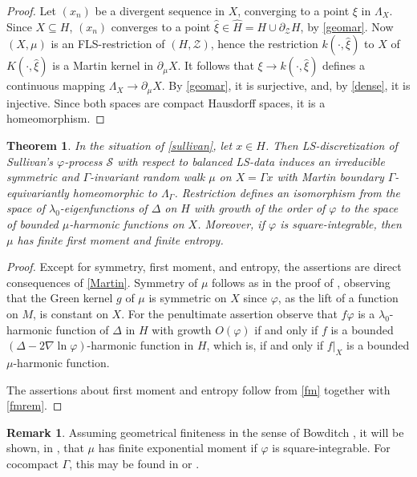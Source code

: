 \documentclass[12pt,a4paper]{amsart}
\numberwithin{equation}{section}
\newtheorem{thm}[equation]{Theorem}
\theoremstyle{definition}
\newtheorem{rem}[equation]{Remark}
\def\vf{\varphi}
\begin{document}
\begin{proof}
Let $(x_n)$ be a divergent sequence in $X$, converging to a point $\xi$ in $\Lambda_X$.
Since $X\subseteq H$, $(x_n)$ converges to a point $\hat\xi\in\hat H=H\cup\partial_{\mathcal{Z}}H$, by \ref{geomar}.
Now $(X,\mu)$ is an FLS-restriction of $(H,\mathcal Z)$, hence the restriction $k(\cdot,\hat\xi)$ to $X$ of $K(\cdot,\hat\xi)$ is a Martin kernel in $\partial_\mu X$.
It follows that $\xi\to k(\cdot,\hat\xi)$ defines a continuous mapping $\Lambda_X\to\partial_\mu X$.
By \ref{geomar}, it is surjective, and, by \cref{dense}, it is injective.
Since both spaces are compact Hausdorff spaces, it is a homeomorphism.
\end{proof}

\begin{thm}\label{sullivan2}
In the situation of \cref{sullivan}, let $x\in H$.
Then LS-discretization of Sullivan's $\vf$-process $\mathcal S$ with respect to balanced LS-data induces an irreducible symmetric and $\Gamma$-invariant random walk $\mu$ on $X=\Gamma x$ with Martin boundary $\Gamma$-equivari\-antly homeomorphic to $\Lambda_\Gamma$.
Restriction defines an isomorphism from the space of $\lambda_0$-eigenfunctions of $\Delta$ on $H$ with growth of the order of $\varphi$ to the space of bounded $\mu$-harmonic functions on $X$.
Moreover, if $\vf$ is square-integrable, then $\mu$ has finite first moment and finite entropy.
\end{thm}

\begin{proof}
Except for symmetry, first moment, and entropy, the assertions are direct consequences of \cref{Martin}.
Symmetry of $\mu$ follows as in the proof of \cite[Theorem 2.7]{BL2}, observing that the Green kernel $g$ of $\mu$ is symmetric on $X$
since $\vf$, as the lift of a function on $M$, is constant on $X$.
For the penultimate assertion observe that $f\varphi$ is a $\lambda_0$-harmonic function of $\Delta$ in $H$ with growth $O(\varphi)$ if and only if $f$ is a bounded $(\Delta-2\nabla\ln\vf)$-harmonic function in $H$, which is, if and only if $f|_X$ is a bounded $\mu$-harmonic function. 

The assertions about first moment and entropy follow from \cref{fm} together with \cref{fmrem}.
\end{proof}

\begin{rem}\label{pinched2}
Assuming geometrical finiteness in the sense of Bowditch \cite{Bo}, it will be shown, in \cite{Nan2}, that $\mu$ has finite exponential moment if $\vf$ is square-integrable.
For cocompact $\Gamma$, this may be found in \cite[Lemma 3.13]{Ba} or \cite[Theorem 2.21]{BP3}. 
\end{rem}
\end{document}
